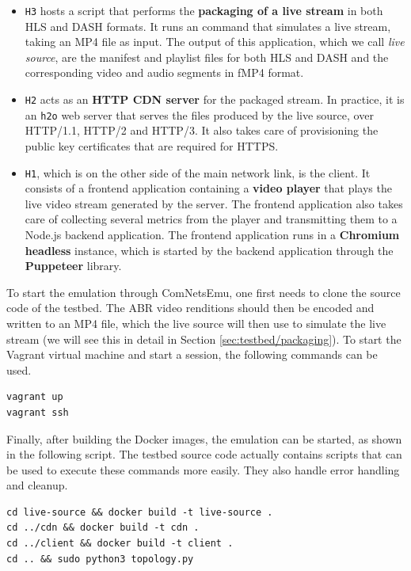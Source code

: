 \begin{itemize}
    \item \texttt{H3} hosts a script that performs the \textbf{packaging of a live stream} in both HLS and DASH formats. It runs an \ffmpeg{} command that simulates a live stream, taking an MP4 file as input. The output of this application, which we call \textit{live source}, are the manifest and playlist files for both HLS and DASH and the corresponding video and audio segments in fMP4 format.
    \item \texttt{H2} acts as an \textbf{HTTP CDN server} for the packaged stream. In practice, it is an \texttt{h2o} web server that serves the files produced by the live source, over HTTP/1.1, HTTP/2 and HTTP/3. It also takes care of provisioning the public key certificates that are required for HTTPS.
    \item \texttt{H1}, which is on the other side of the main network link, is the client. It consists of a frontend application containing a \textbf{video player} that plays the live video stream generated by the server. The frontend application also takes care of collecting several metrics from the player and transmitting them to a Node.js backend application. The frontend application runs in a \textbf{Chromium headless} instance, which is started by the backend application through the \textbf{Puppeteer} library.
\end{itemize}

To start the emulation through ComNetsEmu, one first needs to clone the source code of the testbed. The ABR video renditions should then be encoded and written to an MP4 file, which the live source will then use to simulate the live stream (we will see this in detail in Section \ref{sec:testbed/packaging}). To start the Vagrant virtual machine and start a session, the following commands can be used.

\begin{verbatim}
vagrant up
vagrant ssh
\end{verbatim}

Finally, after building the Docker images, the emulation can be started, as shown in the following script. The testbed source code actually contains scripts that can be used to execute these commands more easily. They also handle error handling and cleanup.

\begin{verbatim}
cd live-source && docker build -t live-source .
cd ../cdn && docker build -t cdn .
cd ../client && docker build -t client .
cd .. && sudo python3 topology.py
\end{verbatim}

